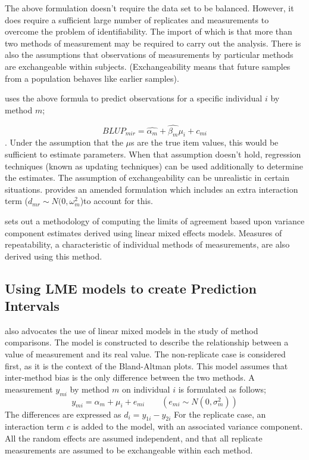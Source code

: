 \documentclass[12pt, a4paper]{report}
\begin{document}
The above formulation doesn't require the data set to be balanced.
However, it does require a sufficient large number of replicates
and measurements to overcome the problem of identifiability. The
import of which is that more than two methods of measurement may
be required to carry out the analysis. There is also the
assumptions that observations of measurements by particular
methods are exchangeable within subjects. (Exchangeability means
that future samples from a population behaves like earlier
samples).


\citet{BXC2004} uses the above formula to predict observations for
a specific individual $i$ by method $m$;

\begin{equation}BLUP_{mir} = \hat{\alpha_{m}} + \hat{\beta_{m}}\mu_{i} +
c_{mi} \end{equation}. Under the assumption that the $\mu$s are
the true item values, this would be sufficient to estimate
parameters. When that assumption doesn't hold, regression
techniques (known as updating techniques) can be used additionally
to determine the estimates. The assumption of exchangeability can
be unrealistic in certain situations. \citet{BXC2004} provides an
amended formulation which includes an extra interaction term ($
d_{mr} \sim N(0,\omega^{2}_{m}$)to account for this.


\newpage
\citet{BXC2008} sets out a methodology of computing the limits of
agreement based upon variance component estimates derived using
linear mixed effects models. Measures of repeatability, a
characteristic of individual methods of measurements, are also
derived using this method.

\subsection{Using LME models to create Prediction Intervals}
\citet{BXC2004} also advocates the use of linear mixed models in
the study of method comparisons. The model is constructed to
describe the relationship between a value of measurement and its
real value. The non-replicate case is considered first, as it is
the context of the Bland-Altman plots. This model assumes that
inter-method bias is the only difference between the two methods.
A measurement $y_{mi}$ by method $m$ on individual $i$ is
formulated as follows;
\begin{equation}
y_{mi}  = \alpha_{m} + \mu_{i} + e_{mi} \qquad ( e_{mi} \sim
N(0,\sigma^{2}_{m}))
\end{equation}
The differences are expressed as $d_{i} = y_{1i} - y_{2i}$ For the
replicate case, an interaction term $c$ is added to the model,
with an associated variance component. All the random effects are
assumed independent, and that all replicate measurements are
assumed to be exchangeable within each method.
\end{document}
